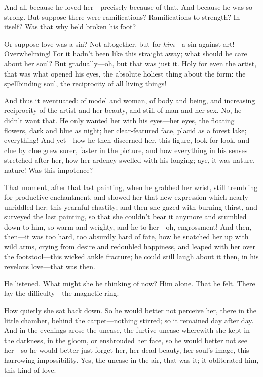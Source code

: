 \documentclass[12pt,a4paper]{article}
\begin{document}
And all because he loved her—precisely because of that. And because he was so strong. But suppose there were ramifications? Ramifications to strength? In itself? Was that why he’d broken his foot?

Or suppose love was a sin? Not altogether, but for \textit{him}—a sin against art! Overwhelming! For it hadn’t been like this straight away; what should he care about her soul? But gradually—oh, but that was just it. Holy for even the artist, that was what opened his eyes, the absolute holiest thing about the form: the spellbinding soul, the reciprocity of all living things!

And thus it eventuated: of model and woman, of body and being, and increasing reciprocity of the artist and her beauty, and still of man and her sex. No, he didn’t want that. He only wanted her with his eyes—her eyes, the floating flowers, dark and blue as night; her clear-featured face, placid as a forest lake; everything! And yet—how he then discerned her, this figure, look for look, and clue by clue grew surer, faster in the picture, and how everything in his senses stretched after her, how her ardency swelled with his longing; aye, it was nature, nature! Was this impotence?

That moment, after that last painting, when he grabbed her wrist, still trembling for productive enchantment, and showed her that new expression which nearly unriddled her: this yearnful chastity; and then she gazed with burning thirst, and surveyed the last painting, so that she couldn’t bear it anymore and stumbled down to him, so warm and weighty, and he to her—oh, engrossment! And then, then—it was too hard, too absurdly hard of fate, how he snatched her up with wild arms, crying from desire and redoubled happiness, and leaped with her over the footstool—this wicked ankle fracture; he could still laugh about it then, in his revelous love—that was then.

He listened. What might she be thinking of now? Him alone. That he felt. There lay the difficulty—the magnetic ring.

How quietly she sat back down. So he would better not perceive her, there in the little chamber, behind the carpet—nothing stirred; so it remained day after day. And in the evenings arose the unease, the furtive unease wherewith she kept in the darkness, in the gloom, or enshrouded her face, so he would better not see her—so he would better just forget her, her dead beauty, her soul’s image, this harrowing impossibility. Yes, the unease in the air, that was it; it obliterated him, this kind of love.
\end{document}

